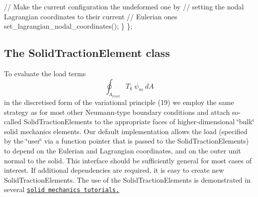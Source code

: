 \begin{DoxyItemize}
\begin{DoxyCode}
    \textcolor{comment}{// Make the current configuration the undeformed one by}
    \textcolor{comment}{// setting the nodal Lagrangian coordinates to their current}
    \textcolor{comment}{// Eulerian ones}
    set\_lagrangian\_nodal\_coordinates();
   \}
\};
\end{DoxyCode}

\end{DoxyItemize}



\hypertarget{index_solid_traction}{}\subsection{The Solid\+Traction\+Element class}\label{index_solid_traction}
To evaluate the load terms \[ \oint_{A_{tract}} T_k \ \psi_m \ dA \] in the discretised form of the variational principle (19) we employ the same strategy as for most other Neumann-\/type boundary conditions and attach so-\/called {\ttfamily Solid\+Traction\+Elements} to the appropriate faces of higher-\/dimensional \char`\"{}bulk\char`\"{} solid mechanics elements. Our default implementation allows the load (specified by the \char`\"{}user\char`\"{} via a function pointer that is passed to the {\ttfamily Solid\+Traction\+Elements}) to depend on the Eulerian and Lagrangian coordinates, and on the outer unit normal to the solid. This interface should be sufficiently general for most cases of interest. If additional dependencies are required, it is easy to create new {\ttfamily Solid\+Traction\+Elements}. The use of the {\ttfamily Solid\+Traction\+Elements} is demonstrated in several \href{../../../example_code_list/html/index.html#solid}{\tt solid mechanics tutorials.}



 

